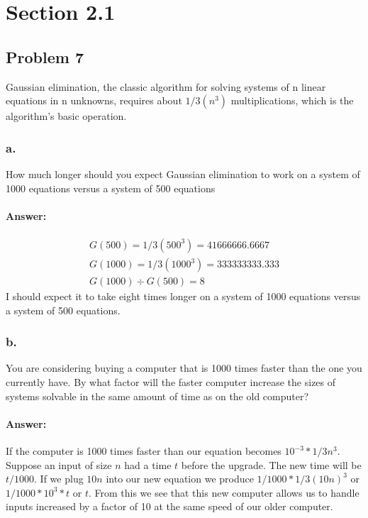 \documentclass{article}
\begin{document}
\section{Section 2.1}
  \subsection{Problem 7}
         Gaussian elimination, the classic algorithm for solving systems of n linear
         equations in n unknowns, requires about $1/3(n^3)$ multiplications, which is the
         algorithm’s basic operation.
     \subsubsection{a.}
          How much longer should you expect Gaussian elimination to work on a
          system of 1000 equations versus a system of 500 equations
        \paragraph{Answer:}
          \begin{align}
            G(500)=1/3(500^3)=41666666.6667 \\
            G(1000)=1/3(1000^3)=333333333.333 \\
            G(1000)\div G(500) = 8
          \end{align}
          I should expect it to take eight times longer on a system of 1000 equations versus a system of 500 equations.
    \subsubsection{b.}
        You are considering buying a computer that is 1000 times faster than the
        one you currently have. By what factor will the faster computer increase
        the sizes of systems solvable in the same amount of time as on the old
        computer?
      \paragraph{Answer:}
        If the computer is 1000 times faster than our equation becomes $10^{-3} * 1/3n^3$. Suppose an input
        of size $n$ had a time $t$ before the upgrade. The new time will be $t/1000$. If we plug $10n$ into our
        new equation we produce $1/1000 * 1/3(10n)^3$ or $1/1000 * 10^3 * t$ or $t$. From this we see that this
        new computer allows us to handle inputs increased by a factor of 10 at the same speed of our older computer.
\end{document}
